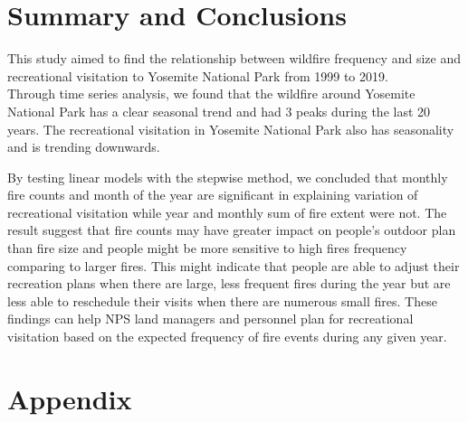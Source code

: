 \documentclass[
  12pt,
]{article}
\begin{document}
\newpage

\hypertarget{summary-and-conclusions}{%
\section{Summary and Conclusions}\label{summary-and-conclusions}}

This study aimed to find the relationship between wildfire frequency and size and recreational visitation to Yosemite National Park from 1999 to 2019.\\
Through time series analysis, we found that the wildfire around Yosemite National Park has a clear seasonal trend and had 3 peaks during the last 20 years. The recreational visitation in Yosemite National Park also has seasonality and is trending downwards.

By testing linear models with the stepwise method, we concluded that monthly fire counts and month of the year are significant in explaining variation of recreational visitation while year and monthly sum of fire extent were not. The result suggest that fire counts may have greater impact on people's outdoor plan than fire size and people might be more sensitive to high fires frequency comparing to larger fires. This might indicate that people are able to adjust their recreation plans when there are large, less frequent fires during the year but are less able to reschedule their visits when there are numerous small fires. These findings can help NPS land managers and personnel plan for recreational visitation based on the expected frequency of fire events during any given year.

\newpage

\hypertarget{appendix}{%
\section{Appendix}\label{appendix}}
\end{document}
